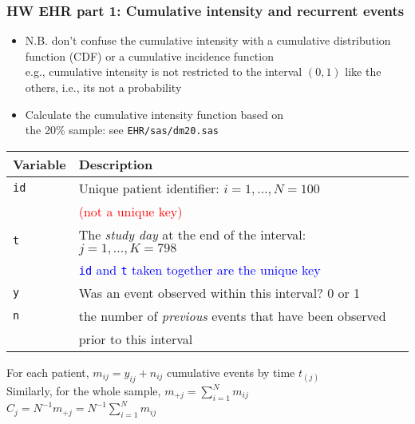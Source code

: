 \documentclass[11pt,pdftex,dvipsnames,usenames,helvetica]{beamer}
\begin{document}
\begin{frame}\frametitle{HW EHR part 1: Cumulative intensity
and recurrent events}

\begin{itemize}
\item N.B. don't confuse the cumulative intensity with
a cumulative distribution function (CDF) or a cumulative incidence
function\\ e.g., cumulative intensity is not restricted to 
the interval $(0, 1)$ like the others, i.e., its not a probability
\item Calculate the cumulative intensity function based on\\ the
20\% sample: see {\tt EHR/sas/dm20.sas}
\end{itemize}
\begin{tabular}{l|l} \hline
Variable & Description \\ \hline
{\tt id} & Unique patient identifier: $i=1, \dots, N=100$\\ 
& \textcolor{red}{(not a unique key)}\\
{\tt t}  & The {\it study day} at the end of the interval: 
$j=1, \dots, K=798$\\
         & \textcolor{blue}{{\tt id} and {\tt t} taken together are the unique key}\\
{\tt y}  & Was an event observed within this interval? 0 or 1\\
{\tt n}  & the number of {\it previous} events that have been observed\\
         & prior to this interval
\end{tabular}
For each patient, $m_{ij}=y_{ij}+n_{ij}$ cumulative events by time $t_{(j)}$\\
Similarly, for the whole sample, $m_{+j}=\sum_{i=1}^N m_{ij}$\\
$C_j = N^{-1} m_{+j} =N^{-1} \sum_{i=1}^N m_{ij}$
\end{frame}
\end{document}
